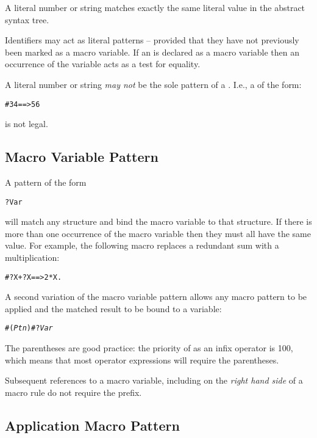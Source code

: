 A literal number or string matches exactly the same literal value in the abstract syntax tree.
\begin{aside}
Identifiers may act as literal patterns -- provided that they have not previously been marked as a macro variable. If an  is declared as a macro variable then an occurrence of the variable acts as a test for equality.
\end{aside}
\begin{aside}
A literal number or string \emph{may not} be the sole pattern of a . I.e., a  of the form:
\begin{alltt}
# 34 ==> 56
\end{alltt}
is not legal.
\end{aside}

\subsection{Macro Variable Pattern}
A pattern of the form 
\begin{alltt}
?Var
\end{alltt}
will match any structure and bind the macro variable  to that structure. If there is more than one occurrence of the macro variable then they must all have the same value. For example, the following macro replaces a redundant sum with a multiplication:
\begin{alltt}
#?X + ?X ==> 2*X.
\end{alltt}
A second variation of the macro variable pattern allows any macro pattern to be applied and the matched result to be bound to a variable:
\begin{alltt}
\#(\emph{Ptn})\#?\emph{Var}
\end{alltt}
\begin{aside}
The parentheses are good practice: the priority of  as an infix operator is 100, which means that most operator expressions will require the parentheses.
\end{aside}

Subsequent references to a macro variable, including on the \emph{right hand side} of a macro rule do not require the  prefix.

\subsection{Application Macro Pattern}
\label{applicMacroPtn}

